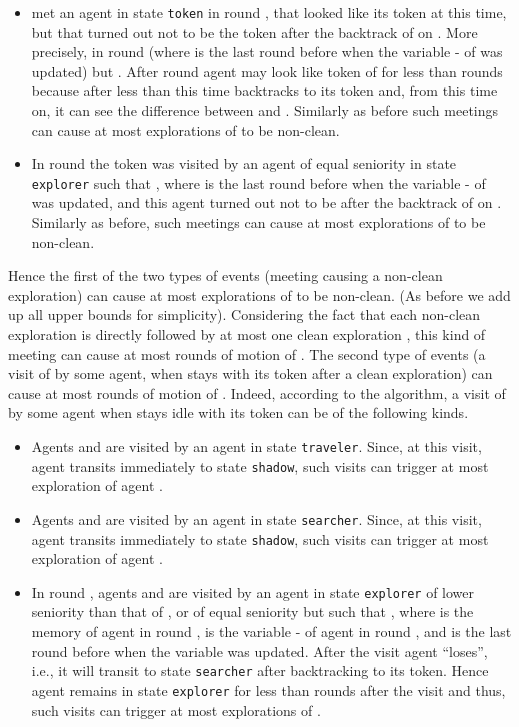\documentclass[11pt]{article}
\newcommand{\qed}{\hfill  \bigbreak}
\newenvironment{proof}{\noindent {\bf Proof.}}{\qed}
\begin{document}
\begin{proof}
\begin{itemize}
   \item
     met an agent   in state {\tt token} in round , that looked like its token  at this time, but that turned out not to be the token  after the backtrack
    of  on . More precisely,  in round  (where  is the last round before  when the variable - of  was updated)
    but . After round  agent  may look like token  of  for {less than}   rounds because after {less than} this time
     backtracks to its token  and, from this time on, it can see the difference between  and .
    Similarly as before such meetings can cause at most {  explorations  of  to be non-clean.} 
    
    \item
    In round  the token  was visited by an agent  of equal seniority in state {\tt explorer} such that , where  is the last round before  when the variable - of  was updated, and this agent turned out not to be  after 
    the backtrack of  on . Similarly as before, such meetings can cause at most { explorations  of  to be non-clean.} 
     \end{itemize}
 {Hence the first of the two types of events (meeting causing a non-clean exploration) can cause at most {} explorations  of  to be non-clean. (As before we add up all upper bounds for simplicity). Considering the fact that each non-clean exploration  is directly followed by at most one clean exploration , this kind of meeting can cause at most {} rounds of motion of .}
 {The second type of events (a visit of  by some agent, when  stays with its token after a clean exploration)
     can cause at most  rounds of motion of . Indeed, according to the algorithm, a visit of  by some agent  when  stays idle with its token 
can be of the following kinds.}

\begin{itemize}
\item {Agents  and  are visited by an agent  in state {\tt traveler}. Since, at this visit, agent  transits immediately to state {\tt shadow}, such visits can trigger at most  exploration  of agent .} 

\item {Agents  and  are visited by an agent  in state {\tt searcher}. Since, at this visit, agent  transits immediately to state {\tt shadow}, such  visits can trigger at most  exploration  of agent .}

\item {In round , agents  and  are visited by an agent  in state {\tt explorer} of lower seniority than that of , or of equal seniority but such that , where  is the memory of agent  in round ,  is the variable - of agent  in round , and  is the last round before  when the variable  was updated. After the visit agent  ``loses'', i.e., it will transit to state {\tt searcher} after backtracking
     to its token. Hence agent  remains in state {\tt explorer} for less than  rounds after the visit and thus, such visits can trigger at most  explorations  of .}


\end{itemize}
\end{proof}
\end{document}
